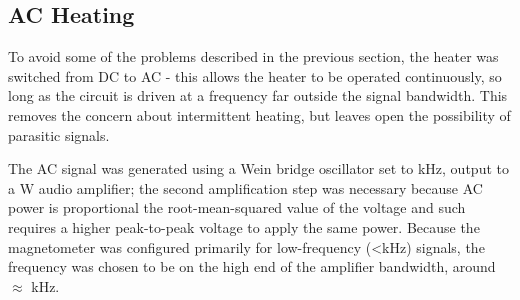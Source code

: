 \documentclass[PaulGanssle-Thesis.tex]{subfiles}
\begin{document}
\subsection{AC Heating}
\label{mag.design.AC.heating}
To avoid some of the problems described in the previous section, the heater was switched from DC to AC - this allows the heater to be operated continuously, so long as the circuit is driven at a frequency far outside the signal bandwidth. This removes the concern about intermittent heating, but leaves open the possibility of parasitic signals.

The AC signal was generated using a Wein bridge oscillator set to \unit[15]{kHz}, output to a \unit[40]{W} audio amplifier; the second amplification step was necessary because AC power is proportional the root-mean-squared value of the voltage and such requires a higher peak-to-peak voltage to apply the same power. Because the magnetometer was configured primarily for low-frequency (<\unit[1]{kHz}) signals, the frequency was chosen to be on the high end of the amplifier bandwidth, around $\approx$ \unit[14]{kHz}.


\end{document}
